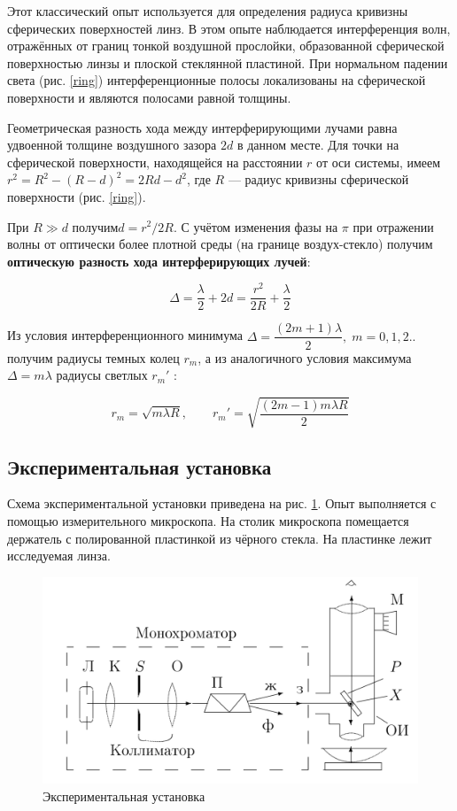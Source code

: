 \documentclass[a4paper,12pt]{report}
\begin{document}
	Этот классический опыт используется для определения радиуса кривизны сферических поверхностей линз. В этом опыте наблюдается интерференция волн, отражённых от границ тонкой воздушной прослойки, образованной сферической поверхностью линзы и плоской стеклянной пластиной. При нормальном падении света (рис. \ref{ring}) интерференционные полосы локализованы на сферической поверхности и являются полосами равной толщины.
	
	Геометрическая разность хода между интерферирующими лучами равна удвоенной толщине воздушного зазора $ 2d $ в данном месте. Для точки на сферической поверхности, находящейся на расстоянии $ r $ от оси системы, имеем $ r^2 = R^2 - (R - d)^2 = 2Rd - d^2 $, где $ R $ --- радиус кривизны сферической поверхности (рис. \ref{ring}).
	
	При $ R \gg d $ получим$  d = r^2/2R $. С учётом изменения фазы на $ \pi $ при отражении волны от оптически более плотной среды (на границе воздух-стекло) получим \textbf{оптическую разность хода интерферирующих лучей}:
	
	\begin{equation}\label{r_m}
	\Delta = \dfrac{\lambda}{2} + 2d = \dfrac{r^2}{2R} + \dfrac{\lambda}{2}
	\end{equation}
	
	Из условия интерференционного минимума $ \Delta = \dfrac{(2m +1)\lambda}{2}, \; m =0, 1, 2.. $ получим радиусы темных колец $ r_m $, а из аналогичного условия максимума $ \Delta = m \lambda $ радиусы светлых $ r_m' $ :
	
	\begin{equation}\label{r_m'}
	r_m = \sqrt{m \lambda R}, \qquad 	r_m' = \sqrt{\dfrac{(2m-1)m \lambda R}{2}}
	\end{equation}
\subsection*{Экспериментальная установка} 

Схема экспериментальной установки приведена на рис. \ref{lab}. Опыт выполняется с помощью измерительного микроскопа.
На столик микроскопа помещается держатель с полированной пластинкой из
чёрного стекла. На пластинке лежит исследуемая линза.
\newpage

	\begin{figure} 
	\includegraphics[width=\linewidth]{lab}
	\caption{Экспериментальная установка}
	\label{lab}
\end{figure}
\end{document}
